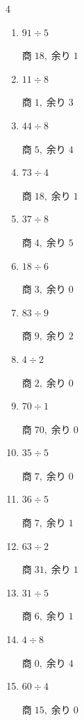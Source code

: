 \begin{multicols}{4}
\begin{enumerate}
  \item $91 \div 5$

        $商\; 18,\; 余り\; 1$

  \item $11 \div 8$

        $商\; 1,\; 余り\; 3$

  \item $44 \div 8$

        $商\; 5,\; 余り\; 4$

\columnbreak %

  \item $73 \div 4$

        $商\; 18,\; 余り\; 1$

  \item $37 \div 8$

        $商\; 4,\; 余り\; 5$

  \item $18 \div 6$

        $商\; 3,\; 余り\; 0$

  \item $83 \div 9$

        $商\; 9,\; 余り\; 2$

  \item $4 \div 2$

        $商\; 2,\; 余り\; 0$

  \item $70 \div 1$

        $商\; 70,\; 余り\; 0$

  \item $35 \div 5$

        $商\; 7,\; 余り\; 0$

  \item $36 \div 5$

        $商\; 7,\; 余り\; 1$

  \item $63 \div 2$

        $商\; 31,\; 余り\; 1$

  \item $31 \div 5$

        $商\; 6,\; 余り\; 1$

  \item $4 \div 8$

        $商\; 0,\; 余り\; 4$

  \item $60 \div 4$

        $商\; 15,\; 余り\; 0$


\end{enumerate}
\end{multicols}
